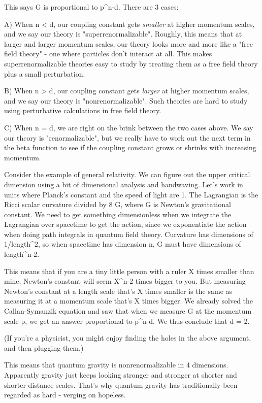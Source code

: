 This says G is proportional to p^{n-d}.  There are 3 cases:


A) When n < d, our coupling constant gets \emph{smaller} at higher
momentum scales, and we say our theory is
"superrenormalizable".  Roughly, this means that at larger and
larger momentum scales, our theory looks more and more like a "free
field theory" - one where particles don't interact at all.  This
makes superrenormalizable theories easy to study by treating them as a
free field theory plus a small perturbation.


 B) When n > d, our coupling constant gets \emph{larger} at
higher momentum scales, and we say our theory is
"nonrenormalizable".  Such theories are hard to study using
perturbative calculations in free field theory.

C)  When n = d, we are right on the brink between the two cases above.
We say our theory is "renormalizable", but we really have to work out
the next term in the beta function to see if the coupling constant
grows or shrinks with increasing momentum.

Consider the example of general relativity.  We can figure out
the upper critical dimension using a bit of dimensional analysis
and handwaving.  Let's work in units where Planck's constant and the 
speed of light are 1.  The Lagrangian is the Ricci scalar curvature 
divided by 8 \pi  G, where G is Newton's gravitational constant.  We 
need to get something dimensionless when we integrate the Lagrangian 
over spacetime to get the action, since we exponentiate the action 
when doing path integrals in quantum field theory.  Curvature has 
dimensions of 1/length^{2}, so when spacetime has dimension n, G must 
have dimensions of length^{n-2}.  

This means that if you are a tiny little person with a ruler X 
times smaller than mine, Newton's constant will seem X^{n-2} times 
bigger to you.  But measuring Newton's constant at a length scale 
that's X times smaller is the same as measuring it at a momentum scale 
that's X times bigger.  We already solved the Callan-Symanzik equation 
and saw that when we measure G at the momentum scale p, we get an
answer proportional to p^{n-d}.  We thus conclude that d = 2.  

(If you're a physicist, you might enjoy finding the holes in the
above argument, and then plugging them.)  

This means that quantum gravity is nonrenormalizable in 4 dimensions.
Apparently gravity just keeps looking stronger and stronger at 
shorter and shorter distance scales.  That's why quantum gravity has 
traditionally been regarded as hard - verging on hopeless.  

